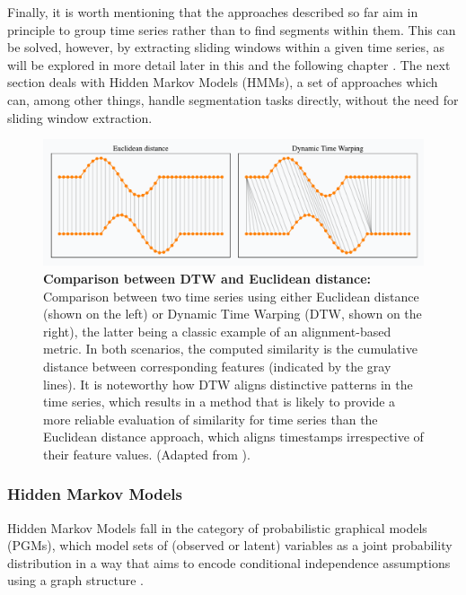 Finally, it is worth mentioning that the approaches described so far aim in principle to group time series rather than to find segments within them. This can be solved, however, by extracting sliding windows within a given time series, as will be explored in more detail later in this and the following chapter \cite{Hsu2021B-SOiDBehaviors, Luxem2022IdentifyingMotion}. The next section deals with Hidden Markov Models (HMMs), a set of approaches which can, among other things, handle segmentation tasks directly, without the need for sliding window extraction.

\begin{figure}[!thb]
\centering
\includegraphics[width=\textwidth]{Figures/sota_3.pdf}

\caption[\textbf{Comparison between DTW and Euclidean distance}]{\textbf{Comparison between DTW and Euclidean distance:} Comparison between two time series using either Euclidean distance (shown on the left) or Dynamic Time Warping (DTW, shown on the right), the latter being a classic example of an alignment-based metric. In both scenarios, the computed similarity is the cumulative distance between corresponding features (indicated by the gray lines). It is noteworthy how DTW aligns distinctive patterns in the time series, which results in a method that is likely to provide a more reliable evaluation of similarity for time series than the Euclidean distance approach, which aligns timestamps irrespective of their feature values. (Adapted from \cite{Tavenard2021AnWarping}).}
\label{fig:2.3}

\end{figure}

\subsubsection{Hidden Markov Models}

Hidden Markov Models fall in the category of probabilistic graphical models (PGMs), which model sets of (observed or latent) variables as a joint probability distribution in a way that aims to encode conditional independence assumptions using a graph structure \cite{Murphy2022ProbabilisticIntroduction}. 

